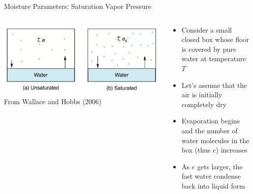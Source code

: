 \begin{frame}{Moisture Parameters: Saturation Vapor Pressure}
\begin{columns}[T]
    \begin{column}{.5\textwidth}
    \begin{minipage}[c][0.8\textheight][c]{\linewidth}
    \includegraphics[width=1\textwidth]{fig1}\\
    \centering \small From Wallace and Hobbs (2006)
    \end{minipage}
    \end{column}
    \begin{column}{.5\textwidth}
    \begin{minipage}[c][0.8\textheight][c]{\linewidth}
   \begin{itemize}
   	\item Consider a small closed box whose floor is covered by pure water at temperature $T$
   	\item Let's assume that the air is initially completely dry
   	\item Evaporation begins and the number of water molecules in the box (thus $e$) increases
   	\item As $e$ gets larger, the fast water condense back into liquid form
   \end{itemize}
      \end{minipage}
    \end{column}
  \end{columns}
\end{frame}


